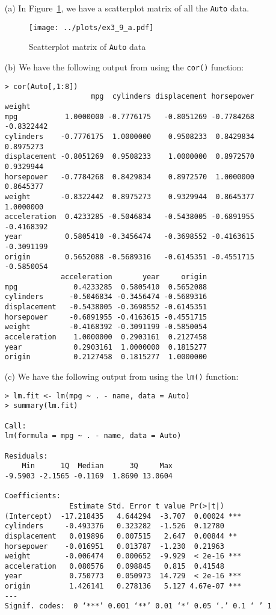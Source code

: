 
\begin{itemize}
    \item[(a)] In Figure~\ref{fig3_9scat}, we have a scatterplot matrix of all the 
        \verb|Auto| data.
        \begin{figure}[!ht]
            \texttt{[image: ../plots/ex3\_9\_a.pdf]}
            \caption{Scatterplot matrix of \texttt{Auto} data \label{fig3_9scat}}
        \end{figure}
    \item[(b)] We have the following output from using the \verb|cor()| function:
        \scriptsize\begin{verbatim}
> cor(Auto[,1:8])
                    mpg  cylinders displacement horsepower     weight
mpg           1.0000000 -0.7776175   -0.8051269 -0.7784268 -0.8322442
cylinders    -0.7776175  1.0000000    0.9508233  0.8429834  0.8975273
displacement -0.8051269  0.9508233    1.0000000  0.8972570  0.9329944
horsepower   -0.7784268  0.8429834    0.8972570  1.0000000  0.8645377
weight       -0.8322442  0.8975273    0.9329944  0.8645377  1.0000000
acceleration  0.4233285 -0.5046834   -0.5438005 -0.6891955 -0.4168392
year          0.5805410 -0.3456474   -0.3698552 -0.4163615 -0.3091199
origin        0.5652088 -0.5689316   -0.6145351 -0.4551715 -0.5850054
             acceleration       year     origin
mpg             0.4233285  0.5805410  0.5652088
cylinders      -0.5046834 -0.3456474 -0.5689316
displacement   -0.5438005 -0.3698552 -0.6145351
horsepower     -0.6891955 -0.4163615 -0.4551715
weight         -0.4168392 -0.3091199 -0.5850054
acceleration    1.0000000  0.2903161  0.2127458
year            0.2903161  1.0000000  0.1815277
origin          0.2127458  0.1815277  1.0000000
        \end{verbatim}\normalsize
    \item[(c)] We have the following output from using the \verb|lm()| function:
        \scriptsize\begin{verbatim}
> lm.fit <- lm(mpg ~ . - name, data = Auto)
> summary(lm.fit)

Call:
lm(formula = mpg ~ . - name, data = Auto)

Residuals:
    Min      1Q  Median      3Q     Max 
-9.5903 -2.1565 -0.1169  1.8690 13.0604 

Coefficients:
               Estimate Std. Error t value Pr(>|t|)    
(Intercept)  -17.218435   4.644294  -3.707  0.00024 ***
cylinders     -0.493376   0.323282  -1.526  0.12780    
displacement   0.019896   0.007515   2.647  0.00844 ** 
horsepower    -0.016951   0.013787  -1.230  0.21963    
weight        -0.006474   0.000652  -9.929  < 2e-16 ***
acceleration   0.080576   0.098845   0.815  0.41548    
year           0.750773   0.050973  14.729  < 2e-16 ***
origin         1.426141   0.278136   5.127 4.67e-07 ***
---
Signif. codes:  0 ‘***’ 0.001 ‘**’ 0.01 ‘*’ 0.05 ‘.’ 0.1 ‘ ’ 1


\end{verbatim}
\end{itemize}
